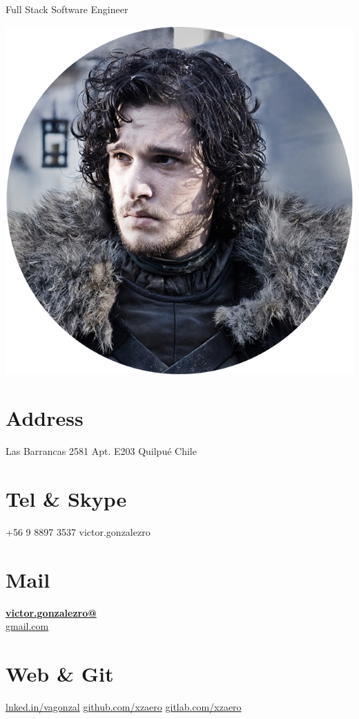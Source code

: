 \documentclass[]{friggeri-cv}
\begin{document}
      {Full Stack Software Engineer}
      

\begin{aside}
  \includegraphics[scale=0.18]{img/snow_circle.png}
  \section{\faHome\space Address}
    Las Barrancas 2581
	Apt. E203
	Quilpué
	Chile
    ~
  \section{\faPhone\space Tel \& Skype}
    \faMobile\space +56 9 8897 3537
    \faSkype\space victor.gonzalezro
    ~
  \section{\faEnvelope\space Mail}
    \href{mailto:victor.gonzalezro@gmail.com}{\textbf{victor.gonzalezro@}\\gmail.com}
    ~
  \section{\faNewspaperO\space Web \& Git}
    \href{http://lnked.in/vagonzal}{\faLinkedin\space lnked.in/vagonzal}
    \href{https://github.com/xzaero}{\faGithub\space github.com/xzaero}
    \href{https://gitlab.com/xzaero}{\faGit\space gitlab.com/xzaero}
    ~

\end{aside}
\end{document}
